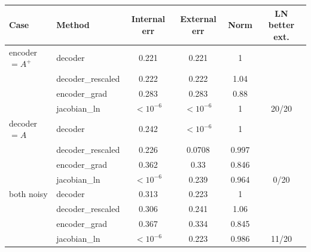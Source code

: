 \begin{tabular}{llcccc}
\toprule
Case & Method & Internal err & External err & Norm & LN better ext. \\
\midrule
encoder $=A^{+}$ & decoder & 0.221 & 0.221 & 1 &  \\
 & decoder\_rescaled & 0.222 & 0.222 & 1.04 &  \\
 & encoder\_grad & 0.283 & 0.283 & 0.88 &  \\
 & jacobian\_ln & $<\!10^{-6}$ & $<\!10^{-6}$ & 1 & 20/20 \\
\midrule
decoder $=A$ & decoder & 0.242 & $<\!10^{-6}$ & 1 &  \\
 & decoder\_rescaled & 0.226 & 0.0708 & 0.997 &  \\
 & encoder\_grad & 0.362 & 0.33 & 0.846 &  \\
 & jacobian\_ln & $<\!10^{-6}$ & 0.239 & 0.964 & 0/20 \\
\midrule
both noisy & decoder & 0.313 & 0.223 & 1 &  \\
 & decoder\_rescaled & 0.306 & 0.241 & 1.06 &  \\
 & encoder\_grad & 0.367 & 0.334 & 0.845 &  \\
 & jacobian\_ln & $<\!10^{-6}$ & 0.223 & 0.986 & 11/20 \\
\bottomrule
\end{tabular}

